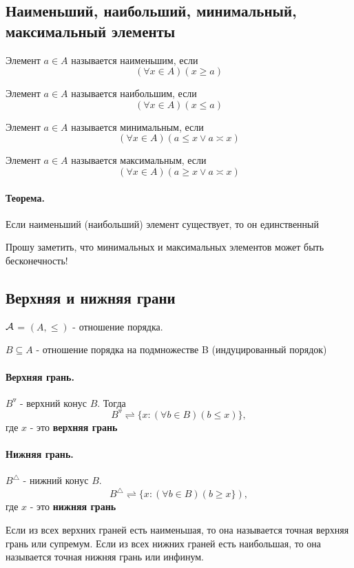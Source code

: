 \documentclass{report}
\begin{document}
\subsection{Наименьший, наибольший,\newline
	минимальный, максимальный элементы}
Элемент $a \in A$ называется наименьшим, если
\[
	(\forall x \in A)(x \ge a)
\] 


Элемент $a \in A$ называется наибольшим, если
\[
	(\forall x \in A)(x \le a)
\] 

\medskip

Элемент $a \in A$ называется минимальным, если
\[
	(\forall x \in A)(a \le x \lor a \asymp x)
\] 


Элемент $a \in A$ называется максимальным, если
\[
	(\forall x \in A)(a \ge x \lor a \asymp x)
\] 

\paragraph*{Теорема.}
Если наименьший (наибольший) элемент существует, то он единственный

\medskip

Прошу заметить, что минимальных и максимальных элементов может быть бесконечность!

\subsection{Верхняя и нижняя грани}
$\cal A$ = $(A, \leq)$ - отношение порядка.

$B \subseteq A$ - отношение порядка на подмножестве B (индуцированный порядок)

\paragraph*{Верхняя грань.}
$B^{\triangledown}$ - верхний конус $B$. Тогда
\[
B^{\triangledown} \rightleftharpoons \{x: (\forall b \in B)(b \leq x)\},
\] 
где $x$ - это \textbf{верхняя грань}

\paragraph*{Нижняя грань.}
$B^{\triangle}$ - нижний конус $B$.
\[
B^{\triangle} \rightleftharpoons \{x: (\forall b \in B)(b \geq x\}),
\] 
где $x$ - это \textbf{нижняя грань}

\medskip

Если из всех верхних граней есть наименьшая, то она называется точная верхняя грань или супремум.
Если из всех нижних граней есть наибольшая, то она называется точная нижняя грань или инфинум.
\end{document}

